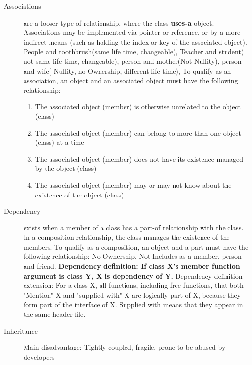 \documentclass[a4paper,11pt,twoside]{book}
\begin{document}
\begin{itemize}
\begin{description}
	
	\item[Associations] are a looser type of relationship, where the class \textbf{uses-a} object. Associations may be implemented via pointer or reference, or by a more indirect means (such as holding the index or key of the associated object).  People and toothbrush(same life time, changeable),  Teacher and student( not same life time, changeable), person and mother(Not Nullity), person and wife( Nullity, no Ownership, different life time), To qualify as an association, an object and an associated object must have the following relationship:
	\begin{enumerate}
		\item The associated object (member) is otherwise unrelated to the object (class)
		\item The associated object (member) can belong to more than one object (class) at a time
		\item The associated object (member) does not have its existence managed by the object (class)
		\item The associated object (member) may or may not know about the existence of the object (class)
	\end{enumerate}


	\item[Dependency] exists when a member of a class has a part-of relationship with the class. In a composition relationship, the class manages the existence of the members. To qualify as a composition, an object and a part must have the following relationship: No Ownership, Not Includes as a member, person and friend.
	\textbf{Dependency definition: If class X's member function argument is class Y, X is dependency of Y.} Dependency definition extension: For a class X, all functions, including free functions, that both "Mention" X and "supplied with" X are logically part of X, because they form part of the interface of X. Supplied with means that they appear in the same header file.


	\item [Inheritance] Main disadvantage: Tightly coupled, fragile, prone to be abused by developers
	\end{description}


\end{itemize}
\end{document}
